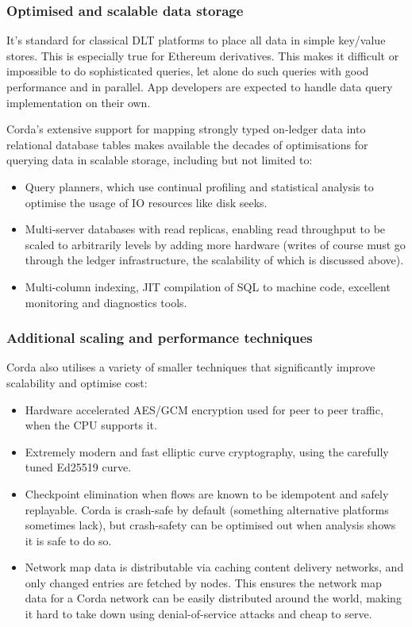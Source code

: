 \documentclass{article}
\begin{document}
\subsubsection{Optimised and scalable data storage}

It's standard for classical DLT platforms to place all data in simple key/value stores. This is especially true for
Ethereum derivatives. This makes it difficult or impossible to do sophisticated queries, let alone do such queries
with good performance and in parallel. App developers are expected to handle data query implementation on their own.

Corda's extensive support for mapping strongly typed on-ledger data into relational database tables makes available
the decades of optimisations for querying data in scalable storage, including but not limited to:

\begin{itemize}
    \item Query planners, which use continual profiling and statistical analysis to optimise the usage of IO
          resources like disk seeks.
    \item Multi-server databases with read replicas, enabling read throughput to be scaled to arbitrarily levels
          by adding more hardware (writes of course must go through the ledger infrastructure, the scalability of
          which is discussed above).
    \item Multi-column indexing, JIT compilation of SQL to machine code, excellent monitoring and diagnostics tools.
\end{itemize}

\subsubsection{Additional scaling and performance techniques}

Corda also utilises a variety of smaller techniques that significantly improve scalability and optimise cost:

\begin{itemize}
    \item Hardware accelerated AES/GCM encryption used for peer to peer traffic, when the CPU supports it.
    \item Extremely modern and fast elliptic curve cryptography, using the carefully tuned Ed25519 curve.
    \item Checkpoint elimination when flows are known to be idempotent and safely replayable. Corda is crash-safe
          by default (something alternative platforms sometimes lack), but crash-safety can be optimised out when
          analysis shows it is safe to do so.
    \item Network map data is distributable via caching content delivery networks, and only changed entries are
          fetched by nodes. This ensures the network map data for a Corda network can be easily distributed around
          the world, making it hard to take down using denial-of-service attacks and cheap to serve.
\end{itemize}
\end{document}
